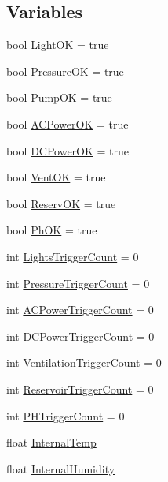 \subsection*{Variables}
\begin{DoxyCompactItemize}
\item 
bool \mbox{\hyperlink{_gbox420_8ino_a65674e3af94f12978bdd207aebb95196}{Light\+OK}} = true
\item 
bool \mbox{\hyperlink{_gbox420_8ino_a6b800426eb6ac787f90648c8cf98e8fd}{Pressure\+OK}} = true
\item 
bool \mbox{\hyperlink{_gbox420_8ino_aff92cbdee084b5d5017a516e5b52719c}{Pump\+OK}} = true
\item 
bool \mbox{\hyperlink{_gbox420_8ino_ac3799863ce8f64dd974ccdc524f04369}{A\+C\+Power\+OK}} = true
\item 
bool \mbox{\hyperlink{_gbox420_8ino_a9781ae68adfd16ac69bbcb4b7ba01003}{D\+C\+Power\+OK}} = true
\item 
bool \mbox{\hyperlink{_gbox420_8ino_af1217617c3ddf0f97e8551cc10a1dbc2}{Vent\+OK}} = true
\item 
bool \mbox{\hyperlink{_gbox420_8ino_a43e238bdd3f33a6308487be831374635}{Reserv\+OK}} = true
\item 
bool \mbox{\hyperlink{_gbox420_8ino_aabe418038a73729e6f7246a45dcfa2cd}{Ph\+OK}} = true
\item 
int \mbox{\hyperlink{_gbox420_8ino_a6b8dcc352c29f11c4e21c9b69c5e5332}{Lights\+Trigger\+Count}} = 0
\item 
int \mbox{\hyperlink{_gbox420_8ino_ad97b53386b5fdba32a54c25a1d9739ac}{Pressure\+Trigger\+Count}} = 0
\item 
int \mbox{\hyperlink{_gbox420_8ino_aee2a63dfd35935aba778043e662d8f4f}{A\+C\+Power\+Trigger\+Count}} = 0
\item 
int \mbox{\hyperlink{_gbox420_8ino_a258ae88c52637b940675c6c883df8016}{D\+C\+Power\+Trigger\+Count}} = 0
\item 
int \mbox{\hyperlink{_gbox420_8ino_af34c955917c73c1bb835d6e5832bd303}{Ventilation\+Trigger\+Count}} = 0
\item 
int \mbox{\hyperlink{_gbox420_8ino_a30a8b4b425d796564807ff7fcc9d452e}{Reservoir\+Trigger\+Count}} = 0
\item 
int \mbox{\hyperlink{_gbox420_8ino_a2a51430cfc83a334f939e4d16acc5ab9}{P\+H\+Trigger\+Count}} = 0
\item 
float \mbox{\hyperlink{_gbox420_8ino_afc30f3ca7354ea885bdcb0fcbae9c60f}{Internal\+Temp}}
\item 
float \mbox{\hyperlink{_gbox420_8ino_a69f9461a3235e00ade51f8317746117f}{Internal\+Humidity}}

\end{DoxyCompactItemize}
